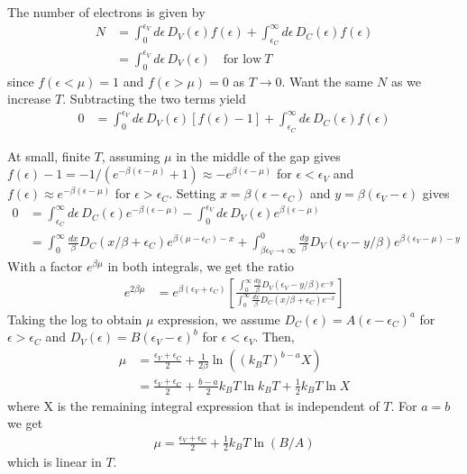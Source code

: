 \documentclass[a4paper, english, 12pt]{article}
\newcommand{\eps}{\epsilon}
\newcommand{\bracket}[1]{\left[ #1 \right]}
\begin{document}
\begin{multicols*}{2}
The number of electrons is given by 
\begin{align*}
    N &= \int_0^{\eps_V} d\eps\,D_V(\eps) f(\eps) + \int_{\eps_C}^\infty d\eps\,D_C(\eps) f(\eps) \\ 
    &= \int_0^{\eps_V} d\eps\,D_V(\eps)\quad\text{for low}\: T 
\end{align*}
since $f(\eps<\mu)=1$ and $f(\eps>\mu)=0$ as $T\to 0$. Want the same $N$ as we increase $T$. Subtracting the two terms yield 
\begin{align*}
    0 &= \int_0^{\eps_V} d\eps\,D_V(\eps) [f(\eps)-1] + \int_{\eps_C}^\infty d\eps\,D_C(\eps) f(\eps)
\end{align*}

At small, finite $T$, assuming $\mu$ in the middle of the gap gives $f(\eps)-1=-1/(e^{-\beta(\eps-\mu)}+1)\approx-e^{\beta(\eps-\mu)}$ for $\eps<\eps_V$ and $f(\eps)\approx e^{-\beta(\eps-\mu)}$ for $\eps>\eps_C$. Setting $x=\beta(\eps-\eps_C)$ and $y=\beta(\eps_V-\eps)$ gives 
\begin{align*}
    0 &= \int_{\eps_C}^\infty d\eps\,D_C(\eps) e^{-\beta(\eps-\mu)} - \int_0^{\eps_V} d\eps\,D_V(\eps) e^{\beta(\eps-\mu)} \\
    &= \int_0^\infty \frac{dx}{\beta} D_C(x/\beta+\eps_C) e^{\beta(\mu-\eps_C)-x} + \int_{\beta\eps_V\to\infty}^0 \frac{dy}{\beta} D_V(\eps_V-y/\beta) e^{\beta(\eps_V-\mu)-y} 
\end{align*}
With a factor $e^{\beta\mu}$ in both integrals, we get the ratio 
\begin{align*}
    e^{2\beta\mu} &= e^{\beta(\eps_V+\eps_C)} \bracket{\frac{\int_0^\infty \frac{dy}{\beta} D_V(\eps_V-y/\beta) e^{-y} }{\int_0^\infty \frac{dx}{\beta} D_C(x/\beta+\eps_C) e^{-x}}}
\end{align*}
Taking the log to obtain $\mu$ expression, we assume $D_C(\eps)=A(\eps-\eps_C)^a$ for $\eps>\eps_C$ and $D_V(\eps)=B(\eps_V-\eps)^b$ for $\eps<\eps_V$. Then, 
\begin{align*}
    \mu &= \frac{\eps_V+\eps_C}{2} + \frac{1}{2\beta} \ln((k_B T)^{b-a} X) \\
    &= \frac{\eps_V+\eps_C}{2} + \frac{b-a}{2} k_B T \ln k_B T +\frac{1}{2}k_B T \ln X
\end{align*}
where X is the remaining integral expression that is independent of $T$. For $a=b$ we get 
\begin{align*}
    \mu = \frac{\eps_V+\eps_C}{2} + \frac{1}{2}k_B T \ln(B/A)
\end{align*}
which is linear in $T$. 


\end{multicols*}
\end{document}
